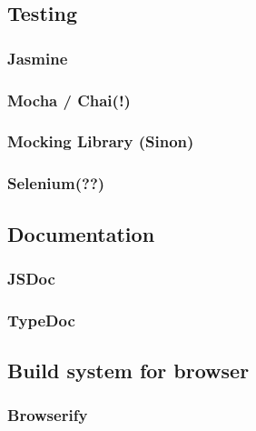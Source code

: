 		
		
		
	\subsection{Testing}
	\label{ssect:testing}
	
		\subsubsection{Jasmine}
		\label{sssect:jasmine}
		
		\subsubsection{Mocha / Chai(!)}
		\label{sssect:mocha_chai}
		
		\subsubsection{Mocking Library (Sinon)}
		\label{sssect:mocking}

		\subsubsection{Selenium(??)}
		\label{sssect:selenium}
		
	
	\subsection{Documentation}
		\label{ssect:documentation}
		
		\subsubsection{JSDoc}
		\label{sssect:jsdoc}
		
		\subsubsection{TypeDoc}
		\label{sssect:typedoc}
		

	\subsection{Build system for browser}
		\label{ssect:build_browser}
		
		\subsubsection{Browserify}
		\label{sssect:browserify}
		
